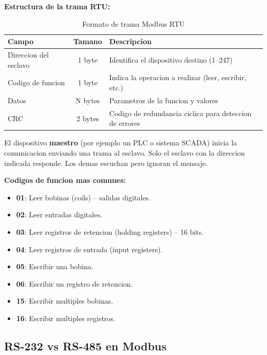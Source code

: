 \textbf{Estructura de la trama RTU:}

\begin{table}[H]
    \centering
    \caption{Formato de trama Modbus RTU}
    \label{tab:modbus_trama}
    \begin{tabular}{|l|c|p{6cm}|}
        \hline
        \textbf{Campo} & \textbf{Tamano} & \textbf{Descripcion} \\
        \hline
        Direccion del esclavo & 1 byte & Identifica el dispositivo destino (1--247) \\
        \hline
        Codigo de funcion & 1 byte & Indica la operacion a realizar (leer, escribir, etc.) \\
        \hline
        Datos & N bytes & Parametros de la funcion y valores \\
        \hline
        CRC & 2 bytes & Codigo de redundancia ciclica para deteccion de errores \\
        \hline
    \end{tabular}
\end{table}

El dispositivo \textbf{maestro} (por ejemplo un PLC o sistema SCADA) inicia la
comunicacion enviando una trama al esclavo. Solo el esclavo con la direccion
indicada responde. Los demas escuchan pero ignoran el mensaje.

\textbf{Codigos de funcion mas comunes:}
\begin{itemize}
    \item \textbf{01}: Leer bobinas (coils) -- salidas digitales.
    \item \textbf{02}: Leer entradas digitales.
    \item \textbf{03}: Leer registros de retencion (holding registers) -- 16 bits.
    \item \textbf{04}: Leer registros de entrada (input registers).
    \item \textbf{05}: Escribir una bobina.
    \item \textbf{06}: Escribir un registro de retencion.
    \item \textbf{15}: Escribir multiples bobinas.
    \item \textbf{16}: Escribir multiples registros.
\end{itemize}

\subsection{RS-232 vs RS-485 en Modbus}


